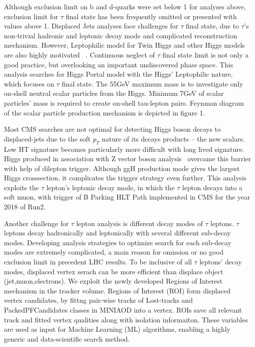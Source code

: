 Although exclusion limit on b and d-quarks were set below 1 for analyses above, exclusion limit for $\tau$ final state has been frequently omitted or presented with values above 1.  
Displaced Jets analyses face challenges for $\tau$ final state, due to $\tau$'s non-trivial hadronic and leptonic decay mode and complicated reconstruction mechanism. 
However, Leptophilic model for Twin Higgs and other Higgs models are also highly motivated ~\cite{Lepto}. Continuous neglect of $\tau$ final state limit is not only a good practice, but overlooking an important undiscovered phase space. 
This analysis searches for Higgs Portal model with the Higgs' Leptophilic nature, which focuses on $\tau$ final state.
The 55GeV maximum mass is to investigate only on-shell neutral scalar particles from the Higgs. 
Minimum 7GeV of scalar particles' mass is required to create on-shell tau-lepton pairs.
Feynman diagram of the scalar particle production mechanism is depicted in figure 1.

Most CMS searches are not optimal for detecting Higgs boson decays to displaced-jets
due to the soft $p_T$ nature of its decays products -- the new scalars.
Low HT signature becomes particularly more difficult with long lived signature.
Higgs produced in association with Z vector boson analysis~\cite{ZHAN} overcame this barrier with help of dilepton trigger. 
Although ggH production mode gives the largest Higgs crosssection, it complicates the trigger strategy even further. 
This analysis exploits the $\tau$ lepton's leptonic decay mode, in which the $\tau$ lepton decays into a soft muon, with trigger of B Parking HLT Path implemented in CMS for the year 2018 of Run2.

Another challenge for $\tau$ lepton analysis is different decay modes of $\tau$ leptons. 
$\tau$ leptons decay hadronically and leptonically with several different sub-decay modes. 
Developing analysis strategies to optimize search for each sub-decay modes are extremely complicated, a main reason for omission or no good exclusion limit in precedent LHC results.
To be inclusive of all $\tau$ leptons' decay modes, displaced vertex serach can be more efficient than displace object (jet,muon,electrons). 
We exploit the newly developed Regions of Interest mechanism in the tracker volume. 
Regions of Interest (ROI) form displaced vertex candidates, by fittng pair-wise tracks of Lost-tracks and PackedPFCandidates classes in MINIAOD into a vertex. 
ROIs save all relevant track and fitted vertex qualities along with isolation informaiton.
These variables are used as input for Machine Learning (ML) algorithms, enabling a highly generic and data-scientific search method.


